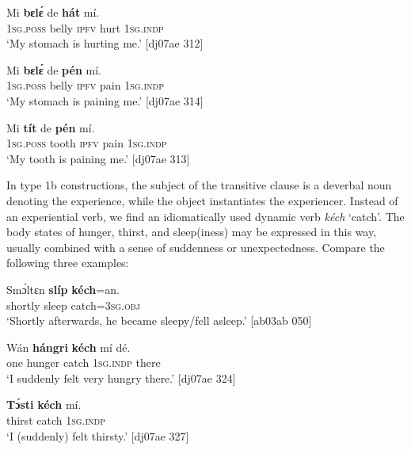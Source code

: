 \ea%
    \label{ex:key:1249}
    \gll Mi    \textbf{bɛlɛ́}    de  \textbf{hát}    mí.\\
\textsc{1sg.poss}  belly  \textsc{ipfv}  hurt    \textsc{1sg.indp}\\

\glt ‘My stomach is hurting me.’ [dj07ae 312]
\z


\ea%
    \label{ex:key:1250}
    \gll Mi    \textbf{bɛlɛ́}    de  \textbf{pén}    mí.\\
\textsc{1sg.poss}  belly  \textsc{ipfv}  pain    \textsc{1sg.indp}\\

\glt ‘My stomach is paining me.’ [dj07ae 314]
\z


\ea%
    \label{ex:key:1251}
    \gll Mi    \textbf{tít}    de  \textbf{pén}    mí.\\
\textsc{1sg.poss}  tooth  \textsc{ipfv}  pain    \textsc{1sg.indp}\\

\glt ‘My tooth is paining me.’ [dj07ae 313]
\z

In type 1b constructions, the subject of the transitive clause is a deverbal noun denoting the experience, while the object instantiates the experiencer. Instead of an experiential verb, we find an idiomatically used dynamic verb \textit{kéch} ‘catch’. The body states of hunger, thirst, and sleep(iness) may be expressed in this way, usually combined with a sense of suddenness or unexpectedness. Compare the following three examples:


\ea%
    \label{ex:key:1252}
    \gll Smɔ́ltɛn    \textbf{slíp}    \textbf{kéch}=an.\\
shortly    sleep  catch=\textsc{3sg.obj}\\

\glt ‘Shortly afterwards, he became sleepy/fell asleep.’ [ab03ab 050]
\z


\ea%
    \label{ex:key:1253}
    \gll Wán    \textbf{hángri}  \textbf{kéch}  mí    dé.\\
one    hunger  catch  \textsc{1sg.indp}  there\\

\glt ‘I suddenly felt very hungry there.’ [dj07ae 324]
\z


\ea%
    \label{ex:key:1254}
    \gll \textbf{Tɔ́sti}  \textbf{kéch}  mí.\\
thirst  catch  \textsc{1sg.indp}\\

\glt ‘I (suddenly) felt thirsty.’ [dj07ae 327]
\z

